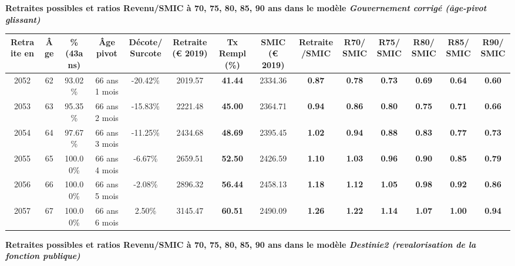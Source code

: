  \vspace{0.1cm} 
{\bf \noindent Retraites possibles et ratios Revenu/SMIC à 70, 75, 80, 85, 90 ans dans le modèle \emph{Gouvernement corrigé (âge-pivot glissant)}}  
 
\begin{adjustbox}{max width=\textwidth} 
\begin{tabular}[htb]{|c|c||c|c|c||c|c||c|c||c|c|c|c|c|} 
\hline 
 Retraite en &  Âge &  \%(43ans) &  Âge pivot &  Décote/Surcote &  Retraite (\euro{} 2019) &  Tx Rempl(\%) &  SMIC (\euro{} 2019) &  Retraite/SMIC &  R70/SMIC &  R75/SMIC &  R80/SMIC &  R85/SMIC &  R90/SMIC \\ 
\hline \hline 
 2052 &  62 &  93.02\% &  66 ans 1 mois &  -20.42\% &  2019.57 &  {\bf 41.44} &  2334.36 &  {\bf {\color{red} 0.87}} &  {\bf {\color{red} 0.78}} &  {\bf {\color{red} 0.73}} &  {\bf {\color{red} 0.69}} &  {\bf {\color{red} 0.64}} &  {\bf {\color{red} 0.60}} \\ 
\hline 
 2053 &  63 &  95.35\% &  66 ans 2 mois &  -15.83\% &  2221.48 &  {\bf 45.00} &  2364.71 &  {\bf {\color{red} 0.94}} &  {\bf {\color{red} 0.86}} &  {\bf {\color{red} 0.80}} &  {\bf {\color{red} 0.75}} &  {\bf {\color{red} 0.71}} &  {\bf {\color{red} 0.66}} \\ 
\hline 
 2054 &  64 &  97.67\% &  66 ans 3 mois &  -11.25\% &  2434.68 &  {\bf 48.69} &  2395.45 &  {\bf 1.02} &  {\bf {\color{red} 0.94}} &  {\bf {\color{red} 0.88}} &  {\bf {\color{red} 0.83}} &  {\bf {\color{red} 0.77}} &  {\bf {\color{red} 0.73}} \\ 
\hline 
 2055 &  65 &  100.00\% &  66 ans 4 mois &  -6.67\% &  2659.51 &  {\bf 52.50} &  2426.59 &  {\bf 1.10} &  {\bf 1.03} &  {\bf {\color{red} 0.96}} &  {\bf {\color{red} 0.90}} &  {\bf {\color{red} 0.85}} &  {\bf {\color{red} 0.79}} \\ 
\hline 
 2056 &  66 &  100.00\% &  66 ans 5 mois &  -2.08\% &  2896.32 &  {\bf 56.44} &  2458.13 &  {\bf 1.18} &  {\bf 1.12} &  {\bf 1.05} &  {\bf {\color{red} 0.98}} &  {\bf {\color{red} 0.92}} &  {\bf {\color{red} 0.86}} \\ 
\hline 
 2057 &  67 &  100.00\% &  66 ans 6 mois &  2.50\% &  3145.47 &  {\bf 60.51} &  2490.09 &  {\bf 1.26} &  {\bf 1.22} &  {\bf 1.14} &  {\bf 1.07} &  {\bf 1.00} &  {\bf {\color{red} 0.94}} \\ 
\hline 
\hline 
\end{tabular} 
\end{adjustbox} 
 
 \vspace{0.1cm} 
{\bf \noindent Retraites possibles et ratios Revenu/SMIC à 70, 75, 80, 85, 90 ans dans le modèle \emph{Destinie2 (revalorisation de la fonction publique)}}  
 
